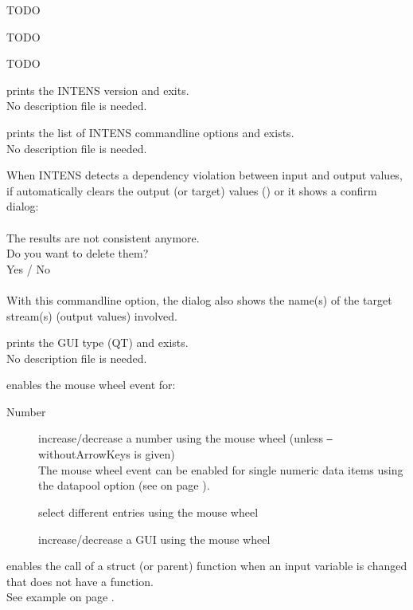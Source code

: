 \begin{description}
  TODO
%
\item[\texttt{--}reflistfile <argument>]
  TODO
%
\item[\texttt{--}helpdir <argument>]
  TODO
%
\item[\texttt{--}version] prints the INTENS version and exits. \\
  No description file is needed.
%
\item[\texttt{--}help] prints the list of INTENS commandline options and exists. \\
  No description file is needed.
%
\item[\texttt{--}withTargetStreamInfo <argument>]
  When INTENS detects a dependency violation between input and output values,
  if automatically clears the output (or target) values (\AUTOCLEARDEPENDENCIES) or
  it shows a confirm dialog: \\ \\
  The results are not consistent anymore. \\
  Do you want to delete them? \\
  Yes / No \\  \\
  With this commandline option, the dialog also shows the name(s) of the
  target stream(s) (output values) involved.
%
\item[\texttt{--}whichGui] prints the GUI type (QT) and exists. \\
  No description file is needed.
%
\item[\texttt{--}withWheelEvent] enables the mouse wheel event for:
  \begin{description}
  \item[Number] increase/decrease a number using the mouse wheel
  (unless \texttt{--}withoutArrowKeys is given) \\
  The mouse wheel event can be enabled for single numeric data items using the datapool option \WHEELEVENT
  (see  on page \pageref{dia:dataitemmoreoption}).
  \item[\COMBOBOX] select different entries using the mouse wheel
  \item[\INDEX] increase/decrease a GUI \INDEX{} using the mouse wheel
  \end{description}
%
\item[\texttt{--}withInputStructFunc] enables the call of a struct (or parent) function
  when an input variable is changed that does not have a function. \\
  See example  on page \pageref{fuexample3}.

\end{description}
